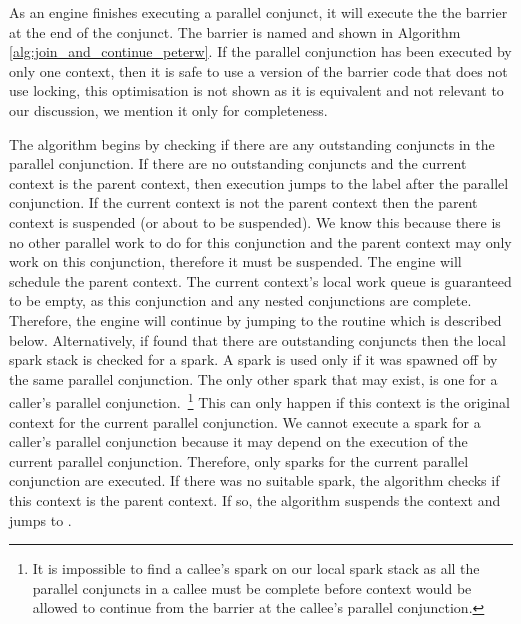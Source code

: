 As an engine finishes executing a parallel conjunct,
it will execute the the barrier at the end of the conjunct.
The barrier is named \joinandcontinue and shown in
Algorithm \ref{alg:join_and_continue_peterw}.
If the parallel conjunction has been executed by
only one context,
then it is safe to use a version of the barrier code that does not use
locking,
this optimisation is not shown as it is equivalent and not relevant to
our discussion,
we mention it only for completeness.

The algorithm begins by checking if there are any outstanding conjuncts in
the parallel conjunction.
If there are no outstanding conjuncts and the current context is the parent
context,
then execution jumps to the label after the parallel conjunction.
If the current context is not the parent context then
the parent context is suspended (or about to be suspended).
We know this because there is no other parallel work to do for this
conjunction and the parent context may only work on this conjunction,
therefore it must be suspended.
The engine will schedule the parent context.
The current context's local work queue is guaranteed to be empty,
as this conjunction and any nested conjunctions are complete.
Therefore,
the engine will continue by jumping to the \getglobalwork routine
which is described below.
Alternatively,
if \joinandcontinue found that there are outstanding conjuncts then
the local spark stack is checked for a spark.
A spark is used only if it was spawned off by the same parallel conjunction.
The only other spark that may exist, is one for a caller's parallel
conjunction.~\footnote{
    It is impossible to find a callee's spark on our local spark stack as
    all the parallel conjuncts in a callee must be complete before context
    would be allowed to continue from the barrier at the callee's parallel
    conjunction.}
This can only happen if this context is the original context for the
current parallel conjunction.
We cannot execute a spark for a caller's parallel conjunction because it may
depend on the execution of the current parallel conjunction.
Therefore, only sparks for the current parallel conjunction are executed.
If there was no suitable spark,
the algorithm checks if this context is the parent context.
If so, the algorithm suspends the context and
jumps to \getglobalwork.

